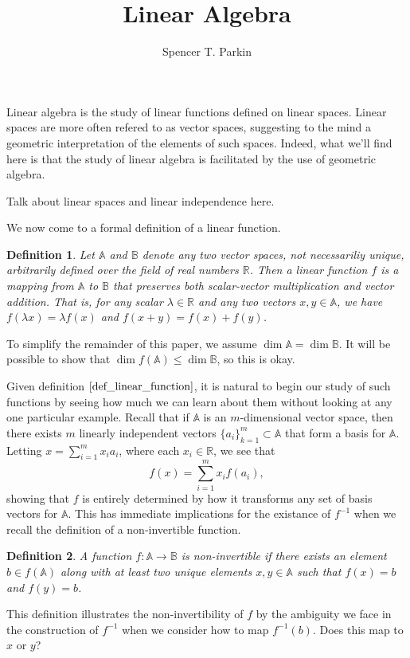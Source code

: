 \documentclass[12pt]{article}
\title{Linear Algebra}
\author{Spencer T. Parkin}
\newcommand{\R}{\mathbb{R}}
\newcommand{\A}{\mathbb{A}}
\newcommand{\B}{\mathbb{B}}
\newtheorem{definition}{Definition}[section]
\begin{document}
\maketitle

Linear algebra is the study of linear functions defined on linear spaces.
Linear spaces are more often refered to as vector spaces, suggesting
to the mind a geometric interpretation of the elements of such spaces.
Indeed, what we'll find here is that the study of linear algebra is facilitated
by the use of geometric algebra.

Talk about linear spaces and linear independence here.

We now come to a formal definition of a linear function.
\begin{definition}\label{def_linear_function}
Let $\A$ and $\B$ denote any two vector spaces, not necessariliy unique, arbitrarily defined
over the field of real numbers $\R$.  Then a
linear function $f$ is a mapping from $\A$ to $\B$ that preserves both scalar-vector multiplication
and vector addition.  That is, for any scalar $\lambda\in\R$ and any two vectors $x,y\in\A$,
we have $f(\lambda x)=\lambda f(x)$ and $f(x+y)=f(x)+f(y)$.
\end{definition}
To simplify the remainder of this paper, we assume $\dim\A=\dim\B$.  It will
be possible to show that $\dim f(\A)\leq\dim\B$, so this is okay.

Given definition $\eqref{def_linear_function}$, it is natural to begin our study of such
functions by seeing how much we can learn about
them without looking at any one particular example.  Recall that if $\A$ is
an $m$-dimensional vector space, then there exists $m$ linearly
independent vectors $\{a_i\}_{k=1}^m\subset\A$ that form a basis for $\A$.
Letting $x = \sum_{i=1}^m x_ia_i$, where each $x_i\in\R$, we see that
\begin{equation}\label{equ_linear_transform}
f(x) = \sum_{i=1}^m x_i f(a_i),
\end{equation}
showing that $f$ is entirely determined by how it transforms any set of basis
vectors for $\A$.  This has immediate implications for the existance of $f^{-1}$
when we recall the definition of a non-invertible function.
\begin{definition}
A function $f:\A\to\B$ is non-invertible if there exists an element $b\in f(\A)$
along with at least two unique elements $x,y\in\A$ such that $f(x)=b$ and $f(y)=b$.
\end{definition}
This definition illustrates the non-invertibility of $f$ by the ambiguity we face in the construction
of $f^{-1}$ when we consider how to map $f^{-1}(b)$.  Does this map to $x$ or $y$?
\end{document}

